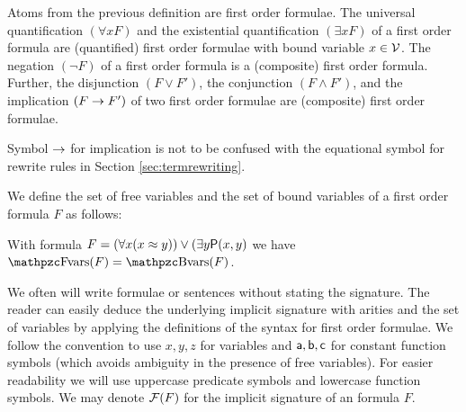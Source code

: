 
\begin{definition}\label{def:syntax:FOF}
	Atoms from the previous definition are {\myem first order formulae}.
	The universal quantification $(\forall x F)$
	and the existential quantification $(\exists x F)$
	of a first order formula are (quantified) first order formulae
	with {\myem bound} variable $x\in\mathcal{V}$.
	The negation $(\lnot F)$ of a first order formula
	is a (composite) first order formula.
	Further, the disjunction $(F \lor F')$,
	the conjunction $(F \land F') $,
	and the implication $(F \rightarrow F')$
	of two first order formulae
	are (composite) first order formulae.
\end{definition}

\begin{remark}
	Symbol $\rightarrow$ for implication is not to be confused
	with the equational symbol for rewrite rules in Section \ref{sec:termrewriting}.
\end{remark}

\begin{definition}\label{def:fof:fvars}\label{def:fof:bvars}
	We define the set of {\myem free} variables and the set of {\myem bound} variables
	of a first order formula $F$ as follows:
\end{definition}

\begin{example}
	With formula $F = (\forall x (x\approx y)) \lor (\exists y \mathsf{P}(x,y)$ we have $\fvar(F) = \bvar(F)$.
\end{example}

We often will write formulae or sentences
without stating the signature.
The reader can easily deduce the underlying {\myem implicit} signature with arities
and the set of variables by applying the definitions of the syntax for first order formulae.
We follow the convention to use $x,y,z$ for variables
and $\mathsf{a},\mathsf{b},\mathsf{c}$ for constant function symbols
(which avoids ambiguity in the presence of free variables).
For easier readability we will use uppercase predicate symbols and lowercase function symbols.
We may denote $\mathcal{F}(F)$ for the implicit signature of an formula $F$.

